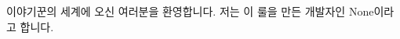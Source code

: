 \documentclass{report}
\begin{document}
	이야기꾼의 세계에 오신 여러분을 환영합니다. 저는 이 룰을 만든 개발자인 None이라고 합니다.
	
	\ifprintout
	
	\else
	
	\fi
\end{document}
